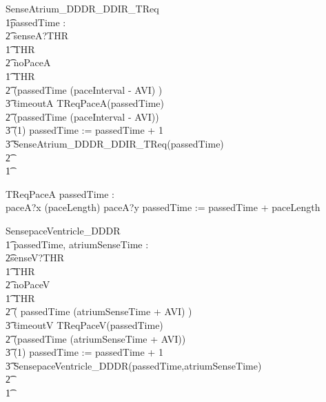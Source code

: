 \begin{circusaction}
SenseAtrium\_DDDR\_DDIR\_TReq \circdef \\
\t1\circvres passedTime : \nat \\
\t2 \circspot senseA?THR \then \\
\t1 \circif  THR  \circthen\\
\t2 noPaceA \then \Skip \\
\t1 \circelse \lnot  THR  \circthen\\
\t2 \circif  (passedTime \geq (paceInterval - AVI) ) \circthen \\
\t3 timeoutA \then TReqPaceA(passedTime) \\
\t2 \circelse \lnot (passedTime \geq (paceInterval - AVI)) \circthen \\
\t3 \circwait(1) \circseq passedTime := passedTime + 1 \circseq\\
\t3 SenseAtrium\_DDDR\_DDIR\_TReq(passedTime) \\
\t2 \circfi\\ 
\t1 \circfi \\ 
\end{circusaction}

\begin{circusaction}
	TReqPaceA \circdef \circvres passedTime : \nat \circspot \\
	paceA?x \then \circwait(paceLength) \circseq paceA?y \then passedTime := passedTime + paceLength 
\end{circusaction}



\begin{circusaction}
SensepaceVentricle\_DDDR \circdef \\
\t1 \circvres passedTime, atriumSenseTime : \nat \\
\t2\circspot senseV?THR \then \\
\t1 \circif  THR  \circthen\\
\t2 noPaceV \then \Skip \\
\t1 \circelse \lnot  THR  \circthen\\
\t2 \circif  ( passedTime \geq (atriumSenseTime + AVI) ) \circthen \\
\t3 timeoutV \then TReqPaceV(passedTime) \\
\t2 \circelse \lnot (passedTime \geq (atriumSenseTime + AVI)) \circthen \\
\t3  \circwait(1) \circseq passedTime := passedTime + 1 \circseq\\
\t3  SensepaceVentricle\_DDDR(passedTime,atriumSenseTime) \\
\t2 \circfi\\ 
\t1 \circfi \\ 
\end{circusaction}



